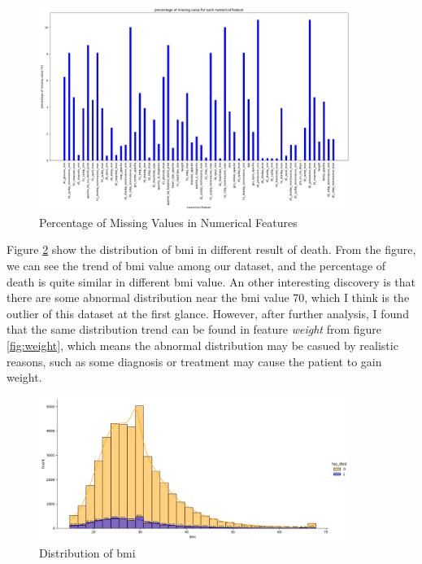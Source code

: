 \documentclass[a4paper, oneside, final, 12pt]{scrartcl} %
\begin{document}
\begin{figure}[h]
  \centering
  \includegraphics[width=0.9\textwidth]{"./image/dataset/num_nan_percentage.png"}
  \caption{Percentage of Missing Values in Numerical Features}
  \label{fig:num_nan_percentage}
\end{figure}

Figure \ref{fig:bmi} show the distribution of bmi in different result of death.
From the figure, we can see the trend of bmi value among our dataset,
and the percentage of death is quite similar in different bmi value.
An other interesting discovery is that there are some abnormal distribution near the bmi value 70,
which I think is the outlier of this dataset at the first glance.
However, after further analysis, I found that the same distribution trend can be found in
feature \emph{weight} from figure \ref{fig:weight},
which means the abnormal distribution may be casued by realistic reasons,
such as some diagnosis or treatment may cause the patient to gain weight.

\begin{figure}[h]
  \centering
  \includegraphics[width=0.9\textwidth]{"./image/dataset/bmi_dis.png"}
  \caption{Distribution of bmi}
  \label{fig:bmi}
\end{figure}
\end{document}
